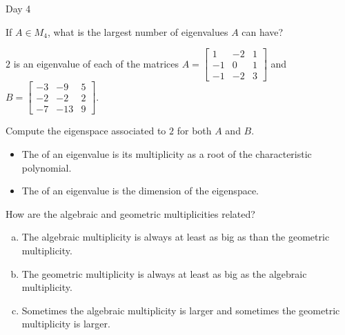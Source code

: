 
\begin{applicationActivities}{Day 4}

\begin{activity}{0}
  If $A \in M_4$, what is the largest number of eigenvalues $A$ can have?
\end{activity}

\begin{activity}{0}
  $2$ is an eigenvalue of each of the matrices $A=\begin{bmatrix} 1 & -2 & 1 \\ -1 & 0 & 1 \\ -1 & -2 & 3\end{bmatrix}$ and $B=\begin{bmatrix} -3 & -9 & 5 \\ -2 & -2 & 2 \\ -7 & -13 & 9 \end{bmatrix}$.

  Compute the eigenspace associated to $2$ for both $A$ and $B$.
\end{activity}

\begin{definition}

\begin{itemize}
\item The  of an eigenvalue is its multiplicity as a root of the characteristic polynomial.
\item The  of an eigenvalue is the dimension of the eigenspace.
\end{itemize}

\end{definition}

\begin{activity}{0} How are the algebraic and geometric multiplicities related?
\begin{enumerate}[(a)]
\item The algebraic multiplicity is always at least as big as than the geometric multiplicity.
\item The geometric multiplicity is always at least as big as the algebraic multiplicity.
\item Sometimes the algebraic multiplicity is larger and sometimes the geometric multiplicity is larger.
\end{enumerate}
\end{activity}


\end{applicationActivities}

